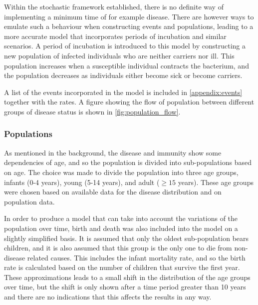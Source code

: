 \documentclass[10pt,a4paper]{article}
\begin{document}
Within the stochastic framework established, there is no definite way of implementing a minimum time of for example disease. There are however ways to emulate such a behaviour when constructing events and populations, leading to a more accurate model that incorporates periods of incubation and similar scenarios. A period of incubation is introduced to this model by constructing a new population of infected individuals who are neither carriers nor ill. This population increases when a susceptible individual contracts the bacterium, and the population decreases as individuals either become sick or become carriers.

A list of the events incorporated in the model is included in \cref{appendix:events} together with the rates. A figure showing the flow of population between different groups of disease status is shown in \cref{fig:population_flow}.




\subsubsection{Populations}

As mentioned in the background, the disease and immunity show some dependencies of age, and so the population is divided into sub-populations based on age. The choice was made to divide the population into three age groups, infants (0-4 years), young (5-14 years), and adult ($\geq15$ years). These age groups were chosen based on available data for the disease distribution and on population data.

In order to produce a model that can take into account the variations of the population over time, birth and death was also included into the model on a slightly simplified basis. It is assumed that only the oldest sub-population bears children, and it is also assumed that this group is the only one to die from non-disease related causes. This includes the infant mortality rate, and so the birth rate is calculated based on the number of children that survive the first year. These approximations leads to a small shift in the distribution of the age groups over time, but the shift is only shown after a time period greater than 10 years and there are no indications that this affects the results in any way.
\end{document}
